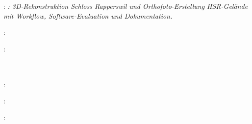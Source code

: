 
\thispagestyle{empty}

\hfill

\vfill

\noindent\myName: \textit{\myTitle: 3D-Rekonstruktion Schloss Rapperswil und
Orthofoto-Erstellung HSR-Gelände mit Workflow, Software-Evaluation und
Dokumentation.}
\textcopyright\ \myTime

\bigskip

\noindent{}: \\
\myHackerspace

\medskip

\noindent{}: \\
\myUni \\
\myFaculty \\
\myProf

\medskip

\noindent{}: \\
\myLocation

\medskip

\noindent{}: \\
\myTime

\medskip

\noindent{}: \\
\myLicense
